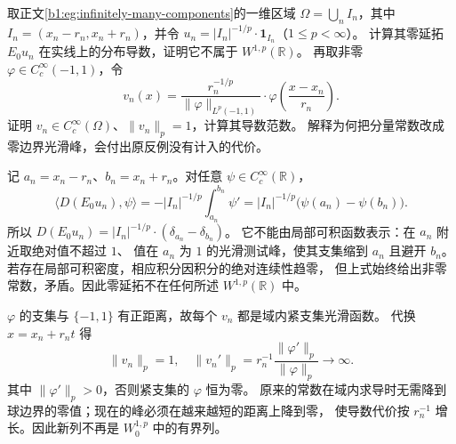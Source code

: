 \begin{exercise}\label{b1:ex:25-infinitely-many-components}
取正文\cref{b1:eg:infinitely-many-components}的一维区域
\(\Omega=\bigcup_n I_n\)，其中 \(I_n=(x_n-r_n,x_n+r_n)\)，并令
\(u_n=|I_n|^{-1/p}\cdot\mathbf1_{I_n}\)（\(1\le p<\infty\)）。
计算其零延拓 \(E_0u_n\) 在实线上的分布导数，证明它不属于 \(W^{1,p}(\mathbb R)\)。
再取非零 \(\varphi\in C_c^\infty(-1,1)\)，令
\[
 v_n(x)=\frac{r_n^{-1/p}}{\|\varphi\|_{L^p(-1,1)}}
        \cdot\varphi\left(\frac{x-x_n}{r_n}\right).
\]
证明 \(v_n\in C_c^\infty(\Omega)\)、\(\|v_n\|_p=1\)，计算其导数范数。
解释为何把分量常数改成零边界光滑峰，会付出原反例没有计入的代价。
\end{exercise}
\begin{solution}
记 \(a_n=x_n-r_n\)、\(b_n=x_n+r_n\)。对任意 \(\psi\in C_c^\infty(\mathbb R)\)，
\[
 \langle D(E_0u_n),\psi\rangle
 =-|I_n|^{-1/p}\int_{a_n}^{b_n}\psi'
 =|I_n|^{-1/p}\bigl(\psi(a_n)-\psi(b_n)\bigr).
\]
所以 \(D(E_0u_n)=|I_n|^{-1/p}\cdot(\delta_{a_n}-\delta_{b_n})\)。
它不能由局部可积函数表示：在 \(a_n\) 附近取绝对值不超过 \(1\)、
值在 \(a_n\) 为 \(1\) 的光滑测试峰，使其支集缩到 \(a_n\) 且避开 \(b_n\)。
若存在局部可积密度，相应积分因积分的绝对连续性趋零，
但上式始终给出非零常数，矛盾。因此零延拓不在任何所述 \(W^{1,p}(\mathbb R)\) 中。

\(\varphi\) 的支集与 \(\{-1,1\}\) 有正距离，故每个 \(v_n\) 都是域内紧支集光滑函数。
代换 \(x=x_n+r_nt\) 得
\[
 \|v_n\|_p=1,\quad
 \|v_n'\|_p=r_n^{-1}\frac{\|\varphi'\|_p}{\|\varphi\|_p}\longrightarrow\infty.
\]
其中 \(\|\varphi'\|_p>0\)，否则紧支集的 \(\varphi\) 恒为零。
原来的常数在域内求导时无需降到球边界的零值；现在的峰必须在越来越短的距离上降到零，
使导数代价按 \(r_n^{-1}\) 增长。因此新列不再是 \(W_0^{1,p}\) 中的有界列。
\end{solution}

